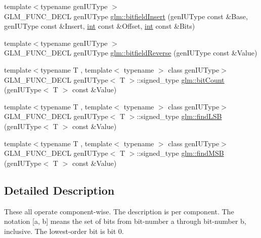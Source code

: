 \begin{DoxyCompactItemize}
\item 
{\footnotesize template$<$typename gen\+I\+U\+Type $>$ }\\G\+L\+M\+\_\+\+F\+U\+N\+C\+\_\+\+D\+E\+C\+L gen\+I\+U\+Type \hyperlink{group__core__func__integer_ga7ab09972d52094d97d2480982e657dd0}{glm\+::bitfield\+Insert} (gen\+I\+U\+Type const \&Base, gen\+I\+U\+Type const \&Insert, \hyperlink{_s_d_l__thread_8h_a6a64f9be4433e4de6e2f2f548cf3c08e}{int} const \&Offset, \hyperlink{_s_d_l__thread_8h_a6a64f9be4433e4de6e2f2f548cf3c08e}{int} const \&Bits)
\item 
{\footnotesize template$<$typename gen\+I\+U\+Type $>$ }\\G\+L\+M\+\_\+\+F\+U\+N\+C\+\_\+\+D\+E\+C\+L gen\+I\+U\+Type \hyperlink{group__core__func__integer_gac28880e609c6eeb0a28f1a54b1edc715}{glm\+::bitfield\+Reverse} (gen\+I\+U\+Type const \&Value)
\item 
{\footnotesize template$<$typename T , template$<$ typename $>$ class gen\+I\+U\+Type$>$ }\\G\+L\+M\+\_\+\+F\+U\+N\+C\+\_\+\+D\+E\+C\+L gen\+I\+U\+Type$<$ T $>$\+::signed\+\_\+type \hyperlink{group__core__func__integer_gaf5ecf64cbcb7f806a3c7915dd622209b}{glm\+::bit\+Count} (gen\+I\+U\+Type$<$ T $>$ const \&Value)
\item 
{\footnotesize template$<$typename T , template$<$ typename $>$ class gen\+I\+U\+Type$>$ }\\G\+L\+M\+\_\+\+F\+U\+N\+C\+\_\+\+D\+E\+C\+L gen\+I\+U\+Type$<$ T $>$\+::signed\+\_\+type \hyperlink{group__core__func__integer_ga43d5d9ec05ba4c46035c764ad5fd3135}{glm\+::find\+L\+S\+B} (gen\+I\+U\+Type$<$ T $>$ const \&Value)
\item 
{\footnotesize template$<$typename T , template$<$ typename $>$ class gen\+I\+U\+Type$>$ }\\G\+L\+M\+\_\+\+F\+U\+N\+C\+\_\+\+D\+E\+C\+L gen\+I\+U\+Type$<$ T $>$\+::signed\+\_\+type \hyperlink{group__core__func__integer_gaee931af2eaecf61b629b33899c9d6f29}{glm\+::find\+M\+S\+B} (gen\+I\+U\+Type$<$ T $>$ const \&Value)
\end{DoxyCompactItemize}


\subsection{Detailed Description}
These all operate component-\/wise. The description is per component. The notation \mbox{[}a, b\mbox{]} means the set of bits from bit-\/number a through bit-\/number b, inclusive. The lowest-\/order bit is bit 0. 

